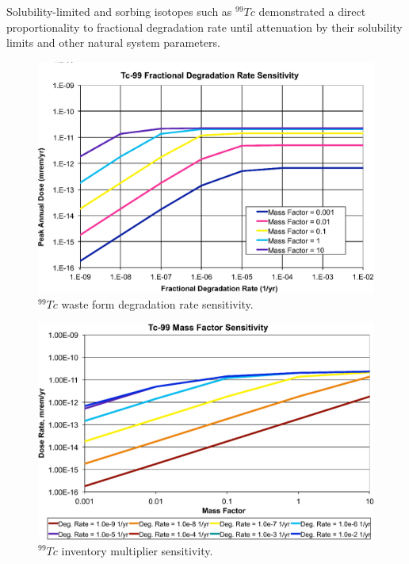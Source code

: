 Solubility-limited and sorbing isotopes such as $^{99}Tc$ demonstrated a direct 
proportionality to fractional degradation rate until attenuation by their 
solubility limits and other natural system parameters. 

\begin{figure}[H]
  \centering
  \includegraphics[width=\linewidth]{Tc99_deg_rate.eps}
  \caption{$^{99}Tc$ waste form degradation rate sensitivity.}
  \label{fig:WFDegTc99}
\end{figure}

\begin{figure}[H]
  \centering
  \includegraphics[width=\linewidth]{Tc99_mass_factor.eps}
  \caption{$^{99}Tc$ inventory multiplier sensitivity.}
  \label{fig:WFDegTc99MF}
\end{figure}

